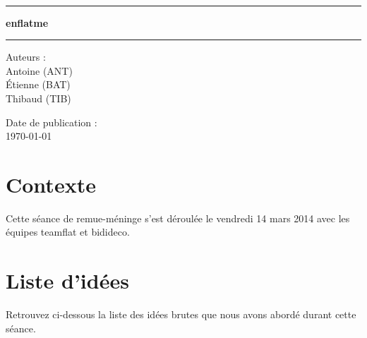 \documentclass[a4paper, 12pt, french]{article}
\newcommand{\nomProjet}{enflatme\xspace}
\begin{document}
	\begin{titlepage}
		\begin{center}
			\LARGE{} \\
		    \rule{\linewidth}{1.5pt}
		    \huge{\textbf{\nomProjet}}
		    \rule{\linewidth}{1.5pt} \newline{} \newline{}
		\end{center}
		\begin{center}
		    \large{Auteurs :}\\ Antoine  (ANT)\\ Étienne  (BAT) \\ Thibaud  (TIB)
		\end{center}
		\vspace{50px}
		\begin{center}
			\large{Date de publication :}\\ \today
		\end{center}
	\end{titlepage}

	\section{Contexte}
	Cette séance de remue-méninge s'est déroulée le vendredi 14 mars 2014 avec les équipes teamflat et bidideco.

	\section{Liste d'idées}
	Retrouvez ci-dessous la liste des idées brutes que nous avons abordé durant cette séance.
\end{document}
